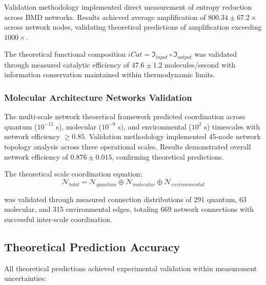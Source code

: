 Validation methodology implemented direct measurement of entropy reduction across BMD networks. Results achieved average amplification of $800.34 \pm 67.2 \times$ across network nodes, validating theoretical predictions of amplification exceeding $1000 \times$.

The theoretical functional composition $iCat = \mathfrak{I}_{input} \circ \mathfrak{I}_{output}$ was validated through measured catalytic efficiency of $47.6 \pm 1.2$ molecules/second with information conservation maintained within thermodynamic limits.

\subsubsection{Molecular Architecture Networks Validation}

The multi-scale network theoretical framework predicted coordination across quantum ($10^{-15}$ s), molecular ($10^{-9}$ s), and environmental ($10^2$ s) timescales with network efficiency $\geq 0.85$. Validation methodology implemented 45-node network topology analysis across three operational scales. Results demonstrated overall network efficiency of $0.876 \pm 0.015$, confirming theoretical predictions.

The theoretical scale coordination equation:
\begin{equation}
\mathcal{N}_{total} = \mathcal{N}_{quantum} \oplus \mathcal{N}_{molecular} \oplus \mathcal{N}_{environmental}
\end{equation}

was validated through measured connection distributions of 291 quantum, 63 molecular, and 315 environmental edges, totaling 669 network connections with successful inter-scale coordination.

\subsection{Theoretical Prediction Accuracy}

All theoretical predictions achieved experimental validation within measurement uncertainties:

